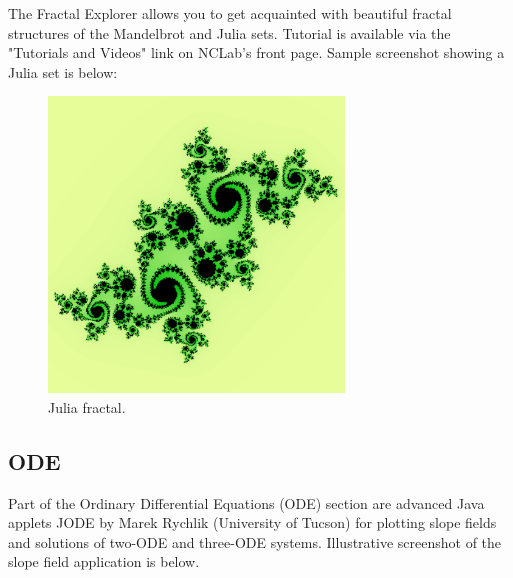 \documentclass[article,A4,12pt]{llncs}
\begin{document}
The Fractal Explorer allows you to get acquainted with beautiful 
fractal structures of the Mandelbrot and Julia sets. Tutorial 
is available via the "Tutorials and Videos" link on NCLab's front page. 
Sample screenshot showing a Julia set is below:

\begin{figure}[!ht]
\begin{center}
\includegraphics[width=0.7\textwidth]{img/julia.png}
\end{center}
\caption{Julia fractal.}
\label{fig:julia}
\end{figure}




\subsection{ODE}

Part of the Ordinary Differential Equations (ODE) section are advanced Java applets JODE by Marek 
Rychlik (University of Tucson) for plotting slope fields and solutions 
of two-ODE and three-ODE systems. Illustrative screenshot of the slope 
field application is below.

\newpage
\end{document}
